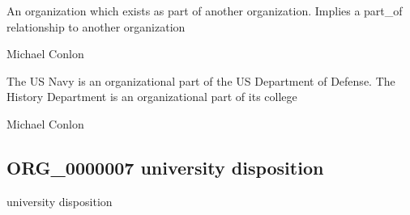 \documentclass[letterpaper,10pt,english]{sphinxmanual}
\begin{document}
\begin{sphinxShadowBox}

\sphinxAtStartPar
An organization which exists as part of another organization.  Implies a part\_of relationship to another organization
\end{sphinxShadowBox}

\begin{sphinxShadowBox}

\sphinxAtStartPar
Michael Conlon 
\end{sphinxShadowBox}

\begin{sphinxShadowBox}

\sphinxAtStartPar
The US Navy is an organizational part of the US Department of Defense.  The History Department is an organizational part of its college
\end{sphinxShadowBox}

\begin{sphinxShadowBox}

\sphinxAtStartPar
Michael Conlon 
\end{sphinxShadowBox}
\begin{quote}

\ignorespaces \end{quote}


\subsection{ORG\_0000007 \sphinxhyphen{} university disposition}
\label{\detokenize{doc-ORG_0000007:org-0000007-university-disposition}}\label{\detokenize{doc-ORG_0000007:index-0}}\label{\detokenize{doc-ORG_0000007::doc}}
\begin{sphinxShadowBox}

\sphinxAtStartPar
university disposition
\end{sphinxShadowBox}

\begin{sphinxShadowBox}

\sphinxAtStartPar
{\hyperref[\detokenize{doc-BFO_0000016::doc}]{}}
\end{sphinxShadowBox}
\end{document}
